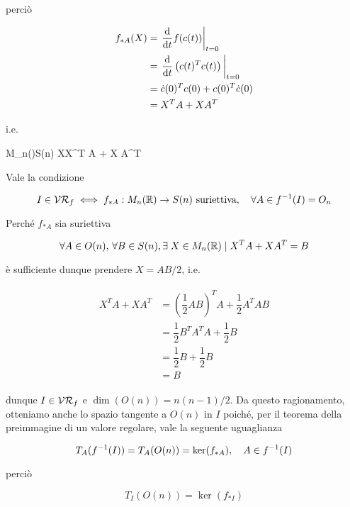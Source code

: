 perciò

\begin{align}
	\begin{split}
		f_{*A}(X) &= \eval{ \dv{t} f(c(t)) }_{t=0} \\
		&= \eval{ \dv{t} \left( c(t)^{T} c(t) \right) }_{t=0} \\
		&= \dot{c}(0)^{T} c(0) + c(0)^{T} \dot{c}(0) \\
		&= X^{T} A + X A^{T}
	\end{split}
\end{align}

i.e.

	{M_{n}(\R)}{S(n)}
	{X}{X^{T} A + X A^{T}}

Vale la condizione

\begin{equation}
	I \in \VR_{f} %
	\iff %
	f_{*A} : M_{n}(\R) \to S(n) \text{ suriettiva} \qcomma \forall A \in f^{-1}(I) = O_{n}
\end{equation}

Perché $ f_{*A} $ sia suriettiva

\begin{equation}
	\forall A \in O(n), \, \forall B \in S(n), \exists \; X \in M_{n}(\mathbb{R}) \mid X^{T} A + X A^{T} = B
\end{equation}

è sufficiente dunque prendere $ X = A B / 2 $, i.e.

\begin{align}
	\begin{split}
		X^{T} A + X A^{T} &= \left( \dfrac{1}{2} A B \right)^{T} A + \dfrac{1}{2} A^{T} A B\\
		&= \dfrac{1}{2} B^{T} A^{T} A + \dfrac{1}{2} B\\
		&= \dfrac{1}{2} B + \dfrac{1}{2} B\\
		&= B
	\end{split}
\end{align}

dunque $ I \in \mathcal{VR}_{f} $ e $ \dim(O(n)) = n(n-1)/2 $. Da questo ragionamento, otteniamo anche lo spazio tangente a $ O(n) $ in $ I $ poiché, per il teorema della preimmagine di un valore regolare, vale la seguente uguaglianza

\begin{equation}
	T_{A}(f^{-1}(I)) = T_{A}(O(n)) = \ker(f_{*A}) \qcomma A \in f^{-1}(I)
\end{equation}

perciò

\begin{equation}
	T_{I}(O(n)) = \ker(f_{*I})
\end{equation}

